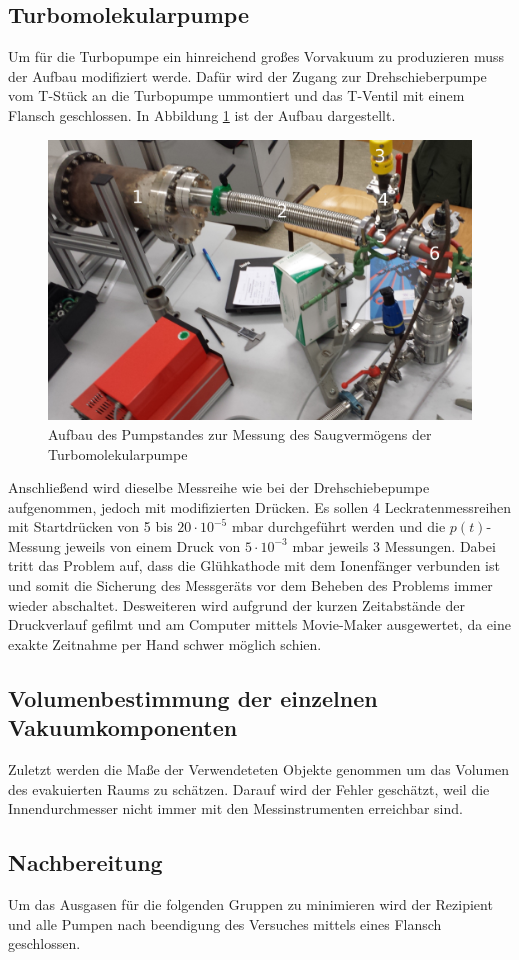 \subsection{Turbomolekularpumpe}
Um für die Turbopumpe ein hinreichend großes Vorvakuum zu produzieren muss der Aufbau modifiziert werde. Dafür wird der Zugang zur Drehschieberpumpe vom T-Stück an die Turbopumpe ummontiert und das T-Ventil mit einem Flansch geschlossen. In Abbildung \ref{fig:Turbo} ist der Aufbau dargestellt.
\begin{figure}[htpb]
  \centering
  \includegraphics[width=\textwidth]{picture/Aufgabe2.jpg}
  \caption{Aufbau des Pumpstandes zur Messung des Saugvermögens der Turbomolekularpumpe}
  \label{fig:Turbo}
\end{figure}
Anschließend wird dieselbe Messreihe wie bei der Drehschiebepumpe aufgenommen, jedoch mit modifizierten Drücken. Es sollen 4 Leckratenmessreihen mit Startdrücken von 5 bis $20 \cdot 10^{-5}$ mbar durchgeführt werden und die $p(t)$-Messung jeweils von einem Druck von $5 \cdot 10^{-3}$ mbar jeweils 3 Messungen. Dabei tritt das Problem auf, dass die Glühkathode mit dem Ionenfänger verbunden ist und somit die Sicherung des Messgeräts vor dem Beheben des Problems immer wieder abschaltet. Desweiteren wird aufgrund der kurzen Zeitabstände der Druckverlauf gefilmt und am Computer mittels Movie-Maker ausgewertet, da eine exakte Zeitnahme per Hand schwer möglich schien.

\subsection{Volumenbestimmung der einzelnen Vakuumkomponenten}
Zuletzt werden die Maße der Verwendeteten Objekte genommen um das Volumen des evakuierten Raums zu schätzen. Darauf wird der Fehler geschätzt, weil die Innendurchmesser nicht immer mit den Messinstrumenten erreichbar sind.
\subsection{Nachbereitung}
Um das Ausgasen für die folgenden Gruppen zu minimieren wird der Rezipient und alle Pumpen nach beendigung des Versuches mittels eines Flansch geschlossen.
